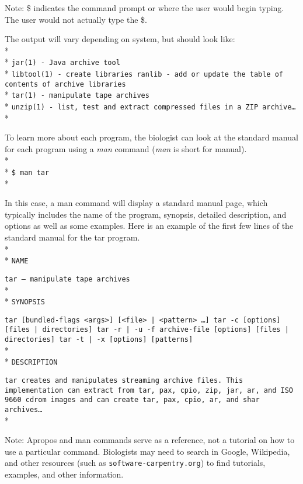 \documentclass[ChapterTOCs,krantz2]{krantz} %
\begin{document}
Note: \$ indicates the command prompt or where the user would begin typing.
The user would not actually type the \$.

The output will vary depending on system, but should look like:\\* \\*
\texttt{jar(1)    - Java archive tool}\\*
\texttt{libtool(1)    - create libraries ranlib - add or update the table of
contents of archive libraries}\\*
\texttt{tar(1)    - manipulate tape archives}\\*
\texttt{unzip(1)    - list, test and extract compressed files in a
ZIP archive\ldots}\\*

To learn more about each program, 
the biologist can look at the standard manual for each program using a
\emph{man} command (\emph{man} is short for manual).\\* \\*
\texttt{\$ man tar}\\*

In this case, a man command will display a standard manual page, which
typically includes the name of the program, synopsis, detailed description, and
options as well as some examples. Here is an example of the first few lines of
the standard manual for the tar program.\\* \\*
\texttt{NAME}

\texttt{tar -- manipulate tape archives}\\* \\*
\texttt{SYNOPSIS}

\texttt{tar [bundled-flags <args>] [<file> | <pattern> \ldots] tar {-c}
[options] [files | directories] tar {-r | -u} -f archive-file [options] [files
| directories] tar {-t | -x} [options] [patterns]}\\* \\*
\texttt{DESCRIPTION}

\texttt{tar creates and manipulates streaming archive files.  This
implementation can extract from tar, pax, cpio, zip, jar, ar, and ISO 9660
cdrom images and can create tar, pax, cpio, ar, and shar archives\ldots}\\*

Note: Apropos and man commands serve as a reference, not a tutorial on how to use
a particular command. Biologists may need to search in Google,
Wikipedia, and other resources (such as \texttt{software-carpentry.org}) 
to find tutorials, examples, and other information.
\end{document}

